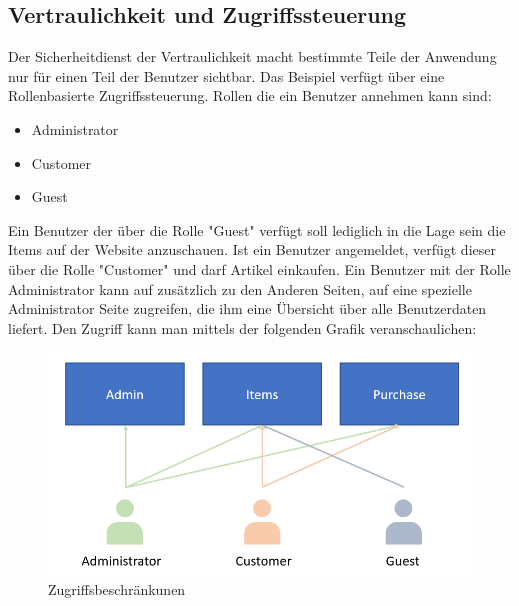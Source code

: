 \documentclass[utf8,biblatex]{lni}
\begin{document}
\subsection{Vertraulichkeit und Zugriffssteuerung}

Der Sicherheitdienst der Vertraulichkeit macht bestimmte Teile der Anwendung nur für einen Teil der Benutzer sichtbar. 
Das Beispiel verfügt über eine Rollenbasierte Zugriffssteuerung. 
Rollen die ein Benutzer annehmen kann sind: 
\begin{itemize}
  \item Administrator
  \item Customer
  \item Guest
\end{itemize}

Ein Benutzer der über die Rolle "Guest" verfügt soll lediglich in die Lage sein die Items auf der Website anzuschauen. 
Ist ein Benutzer angemeldet, verfügt dieser über die Rolle "Customer" und darf Artikel einkaufen. 
Ein Benutzer mit der Rolle Administrator kann auf zusätzlich zu den Anderen Seiten, auf eine spezielle Administrator Seite zugreifen, die ihm eine Übersicht über 
alle Benutzerdaten liefert. 
Den Zugriff kann man mittels der folgenden Grafik veranschaulichen:

\begin{figure}
  \centering
  \includegraphics[width=\textwidth]{images/access.png}
  \caption[Zugriffsbeschränkunen]{Zugriffsbeschränkunen} 
  \label{access-desc}
\end{figure} 
\end{document}
